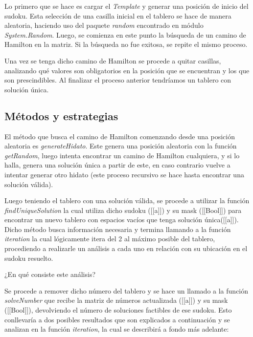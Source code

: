 \documentclass[10pt]{amsart}
\begin{document}
        Lo primero que se hace es cargar el \textit{Template} y generar una posici\'on de inicio del sudoku. Esta selecci\'on de una casilla inicial en el tablero se hace de manera aleatoria, haciendo uso del paquete \textit{random} encontrado en m\'odulo \textit{System.Random}. Luego, se comienza en este punto la b\'usqueda de un camino de Hamilton en la matriz. Si la b\'usqueda no fue exitosa, se repite el mismo proceso. 
        
        Una vez se tenga dicho camino de Hamilton se procede a quitar casillas, analizando qué valores son obligatorios en la posici\'on que se encuentran y los que son prescindibles. Al finalizar el proceso anterior tendr\'iamos un tablero con soluci\'on \'unica.
        
        \subsection*{M\'etodos y estrategias}
        El m\'etodo que busca el camino de Hamilton comenzando desde una posici\'on aleatoria es \textit{generateHidato}. Este genera una posici\'on aleatoria con la funci\'on \textit{getRandom}, luego intenta encontrar un camino de Hamilton cualquiera, y si lo halla, genera una soluci\'on \'unica a partir de este, en caso contrario vuelve a intentar generar otro hidato (este proceso recursivo se hace hasta encontrar una soluci\'on v\'alida). 
        
        Luego teniendo el tablero con una soluci\'on v\'alida, se procede a utilizar la funci\'on \textit{findUniqueSolution} la cual utiliza dicho sudoku ([[a]]) y su mask ([[Bool]]) para encontrar un nuevo tablero con espacios vac\'ios que tenga soluci\'on \'unica([[a]]). Dicho m\'etodo busca informaci\'on necesaria y termina llamando a la funci\'on \textit{iteration} la cual l\'ogicamente itera del 2 al m\'aximo posible del tablero, procediendo a realizarle un an\'alisis a cada uno en relaci\'on con su ubicaci\'on en el sudoku resuelto. 
 
        ¿En qu\'e consiste este an\'alisis?
        
        Se procede a remover dicho n\'umero del tablero y se hace un llamado a la funci\'on \textit{solveNumber} que recibe la matriz de n\'umeros actualizada ([[a]]) y su mask ([[Bool]]), devolviendo el n\'umero de soluciones factibles de ese sudoku. Esto conllevar\'ia a dos posibles resultados que son explicados a continuaci\'on y se analizan en la funci\'on \textit{iteration}, la cual se describir\'a a fondo m\'as adelante:
    
\end{document}

